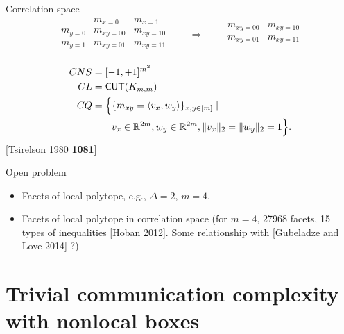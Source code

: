 \documentclass{beamer}
\newcommand\emm[1]{\textcolor{redorange}{{#1}}}
\newcommand\numc[1]{\textcolor{citation}{{\bf #1}}}
\begin{document}
\begin{frame}{Correlation space}
\begin{equation*}
\begin{matrix}
& m_{x=0} & m_{x=1}\\
m_{y=0} & m_{xy=00} & m_{xy=10}\\
m_{y=1} & m_{xy=01} & m_{xy=11}\\
\end{matrix}
\qquad
\Rightarrow
\qquad
\begin{matrix}
 m_{xy=00} & m_{xy=10}\\
 m_{xy=01} & m_{xy=11}\\
\end{matrix}
\end{equation*}

\vspace{1em}
\begin{align*}
CNS &= [-1,+1]^{m^2}\\
CL &= \mathsf{CUT}(K_{m,m})\\
CQ &= \Bigl\{ \{m_{xy} = \langle v_x, w_y\rangle\}_{x,y\in[m]}\mid\\
&\qquad v_x\in\mathbb{R}^{2m}, w_y\in\mathbb{R}^{2m}, \|v_x\|_2=\|w_y\|_2=1\Bigr\}.
\end{align*}
[Tsirelson 1980 \numc{1081}]
\end{frame}

\begin{frame}{Open problem}
\begin{itemize}
\setlength{\itemsep}{30pt}
\item Facets of local polytope, e.g., $\Delta=2$, \emm{$m=4$}.
\item Facets of local polytope in correlation space
(for $m=4$, 27968 facets, 15 types of inequalities [Hoban 2012]. Some relationship with [Gubeladze and Love 2014] ?)
\end{itemize}
\end{frame}
\fi

\section{Trivial communication complexity with nonlocal boxes}
\end{document}

